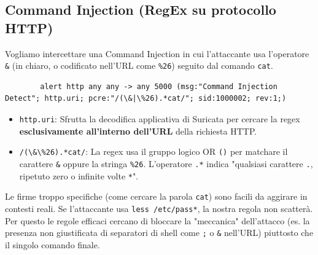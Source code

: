 \documentclass[12pt,a4paper]{report}
\begin{document}
	\subsection{Command Injection (RegEx su protocollo HTTP)}
	Vogliamo intercettare una Command Injection in cui l'attaccante usa l'operatore \texttt{\&} (in chiaro, o codificato nell'URL come \texttt{\%26}) seguito dal comando \texttt{cat}.
	
	\begin{lstlisting}
		alert http any any -> any 5000 (msg:"Command Injection Detect"; http.uri; pcre:"/(\&|\%26).*cat/"; sid:1000002; rev:1;)
	\end{lstlisting}
	\begin{itemize}
		\item \texttt{http.uri}: Sfrutta la decodifica applicativa di Suricata per cercare la regex \textbf{esclusivamente all'interno dell'URL} della richiesta HTTP.
		\item \texttt{/(\textbackslash\&\textbar\textbackslash\%26).*cat/}: La regex usa il gruppo logico OR \texttt{(\textbar)} per matchare il carattere \texttt{\&} oppure la stringa \texttt{\%26}. L'operatore \texttt{.*} indica "qualsiasi carattere \texttt{.}, ripetuto zero o infinite volte \texttt{*}".
	\end{itemize}
	
	\begin{nota}
		Le firme troppo specifiche (come cercare la parola \texttt{cat}) sono facili da aggirare in contesti reali. Se l'attaccante usa \texttt{less /etc/pass*}, la nostra regola non scatterà. Per questo le regole efficaci cercano di bloccare la "meccanica" dell'attacco (es. la presenza non giustificata di separatori di shell come \texttt{;} o \texttt{\&} nell'URL) piuttosto che il singolo comando finale.
	\end{nota}
	
\end{document}
